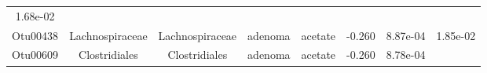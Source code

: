 \documentclass[11pt,]{article}
\begin{document}
\begin{longtable}[]{@{}cccccccc@{}}
\begin{minipage}[t]{0.08\columnwidth}
1.68e-02\strut
\end{minipage}\tabularnewline
\begin{minipage}[t]{0.08\columnwidth}\centering\strut
Otu00438\strut
\end{minipage} & \begin{minipage}[t]{0.15\columnwidth}\centering\strut
Lachnospiraceae\strut
\end{minipage} & \begin{minipage}[t]{0.15\columnwidth}\centering\strut
Lachnospiraceae\strut
\end{minipage} & \begin{minipage}[t]{0.08\columnwidth}\centering\strut
adenoma\strut
\end{minipage} & \begin{minipage}[t]{0.09\columnwidth}\centering\strut
acetate\strut
\end{minipage} & \begin{minipage}[t]{0.07\columnwidth}\centering\strut
-0.260\strut
\end{minipage} & \begin{minipage}[t]{0.08\columnwidth}\centering\strut
8.87e-04\strut
\end{minipage} & \begin{minipage}[t]{0.08\columnwidth}\centering\strut
1.85e-02\strut
\end{minipage}\tabularnewline
\begin{minipage}[t]{0.08\columnwidth}\centering\strut
Otu00609\strut
\end{minipage} & \begin{minipage}[t]{0.15\columnwidth}\centering\strut
Clostridiales\strut
\end{minipage} & \begin{minipage}[t]{0.15\columnwidth}\centering\strut
Clostridiales\strut
\end{minipage} & \begin{minipage}[t]{0.08\columnwidth}\centering\strut
adenoma\strut
\end{minipage} & \begin{minipage}[t]{0.09\columnwidth}\centering\strut
acetate\strut
\end{minipage} & \begin{minipage}[t]{0.07\columnwidth}\centering\strut
-0.260\strut
\end{minipage} & \begin{minipage}[t]{0.08\columnwidth}\centering\strut
8.78e-04\strut
\end{minipage} & \begin{minipage}[t]{0.08\columnwidth}\centering\strut

\end{minipage}
\end{longtable}
\end{document}
